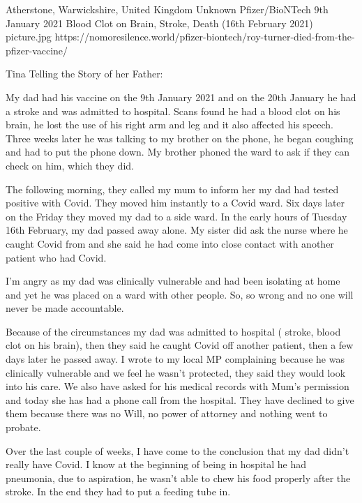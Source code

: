 {Atherstone, Warwickshire, United Kingdom}
{Unknown}
{Pfizer/BioNTech}
{9th January 2021}
{Blood Clot on Brain, Stroke, Death (16th February 2021)}
{picture.jpg}
{https://nomoresilence.world/pfizer-biontech/roy-turner-died-from-the-pfizer-vaccine/}
{

Tina Telling the Story of her Father:

My dad had his vaccine on the 9th January 2021 and on the 20th January he had a
stroke and was admitted to hospital. Scans found he had a blood clot on his
brain, he lost the use of his right arm and leg and it also affected his
speech. Three weeks later he was talking to my brother on the phone, he began
coughing and had to put the phone down. My brother phoned the ward to ask if
they can check on him, which they did.

The following morning, they called my mum to inform her my dad had tested
positive with Covid. They moved him instantly to a Covid ward. Six days later on
the Friday they moved my dad to a side ward. In the early hours of Tuesday 16th
February, my dad passed away alone. My sister did ask the nurse where he caught
Covid from and she said he had come into close contact with another patient who
had Covid.

I’m angry as my dad was clinically vulnerable and had been isolating at home and
yet he was placed on a ward with other people. So, so wrong and no one will
never be made accountable.

Because of the circumstances my dad was admitted to hospital ( stroke, blood
clot on his brain), then they said he caught Covid off another patient, then a
few days later he passed away. I wrote to my local MP complaining because he was
clinically vulnerable and we feel he wasn’t protected, they said they would look
into his care. We also have asked for his medical records with Mum’s permission
and today she has had a phone call from the hospital. They have declined to give
them because there was no Will, no power of attorney and nothing went to
probate.

Over the last couple of weeks, I have come to the conclusion that my dad didn’t
really have Covid. I know at the beginning of being in hospital he had
pneumonia, due to aspiration, he wasn’t able to chew his food properly after the
stroke. In the end they had to put a feeding tube in.

}
